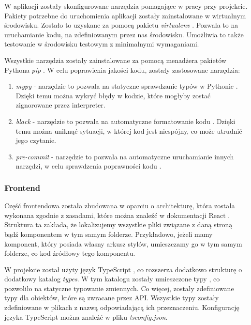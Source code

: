 W aplikacji zostały skonfigurowane narzędzia pomagające w pracy przy projekcie. Pakiety potrzebne do uruchomienia aplikacji zostały zainstalowane w wirtualnym środowisku. Zostało to uzyskane za pomocą pakietu \textit{virtualenv} \cite{virtualenv}. Pozwala to na uruchamianie kodu, na zdefiniowanym przez nas środowisku. Umożliwia to także testowanie w środowisku testowym z minimalnymi wymaganiami. 

Wszystkie narzędzia zostały zainstalowane za pomocą menadżera pakietów Pythona \textit{pip} \cite{pip}. W celu poprawienia jakości kodu, zostały zastosowane narzędzia:
\begin{enumerate}
    \item \textit{mypy} - narzędzie to pozwala na statyczne sprawdzanie typów w Pythonie \cite{mypy}. Dzięki temu można wykryć błędy w kodzie, które mogłyby zostać zignorowane przez interpreter. 
    \item \textit{black} - narzędzie to pozwala na automatyczne formatowanie kodu \cite{black}. Dzięki temu można uniknąć sytuacji, w której kod jest niespójny, co może utrudnić jego czytanie.
    \item \textit{pre-commit} - narzędzie to pozwala na automatyczne uruchamianie innych narzędzi, w celu sprawdzenia poprawności kodu \cite{pre_commit}.
\end{enumerate}

\subsubsection{Frontend}
Część frontendowa została zbudowana w oparciu o architekturę, która została wykonana zgodnie z zasadami, które można znaleźć w dokumentacji \cite{React_file_structure} React \cite{React}. Struktura ta zakłada, że lokalizujemy wszystkie pliki związane z daną stroną bądź komponentem w tym samym folderze. Przykładowo, jeżeli mamy komponent, który posiada własny arkusz stylów, umieszczamy go w tym samym folderze, co kod źródłowy tego komponentu.

W projekcie został użyty język TypeScript \cite{TypeScript}, co rozszerza dodatkowo strukturę o dodatkowy katalog \textit{types}. W tym katalogu zostały umieszczone typy \cite{TypeScript_types}, co pozwoliło na statyczne typowanie zmiennych. Co więcej, zostały zdefiniowane typy dla obiektów, które są zwracane przez API. Wszystkie typy zostały zdefiniowane w plikach z nazwą odpowiadającą ich przeznaczeniu. Konfigurację języka TypeScript można znaleźć w pliku \textit{tsconfig.json}.

